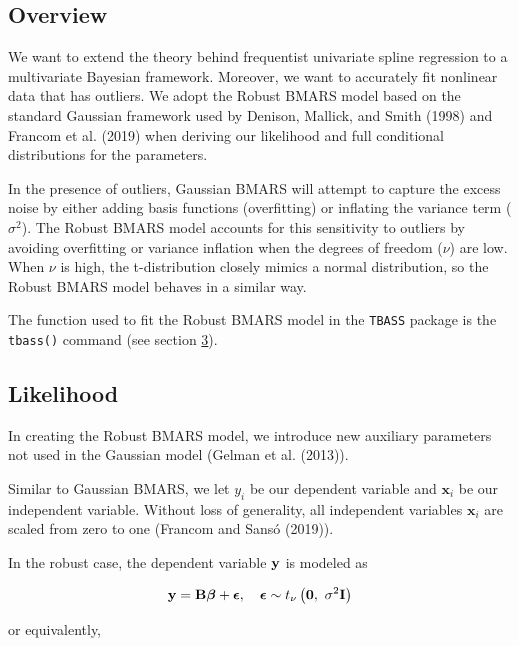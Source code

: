 \documentclass[
]{article}
\begin{document}
\hypertarget{overview}{%
\subsection{Overview}\label{overview}}

We want to extend the theory behind frequentist univariate spline
regression to a multivariate Bayesian framework. Moreover, we want to
accurately fit nonlinear data that has outliers. We adopt the Robust
BMARS model based on the standard Gaussian framework used by Denison,
Mallick, and Smith (1998) and Francom et al. (2019) when deriving our
likelihood and full conditional distributions for the parameters.

In the presence of outliers, Gaussian BMARS will attempt to capture the
excess noise by either adding basis functions (overfitting) or inflating
the variance term (\(\sigma^2\)). The Robust BMARS model accounts for
this sensitivity to outliers by avoiding overfitting or variance
inflation when the degrees of freedom (\(\nu\)) are low. When \(\nu\) is
high, the t-distribution closely mimics a normal distribution, so the
Robust BMARS model behaves in a similar way.

The function used to fit the Robust BMARS model in the \texttt{TBASS}
package is the \texttt{tbass()} command (see section
\protect\hyperlink{tbass}{3}).

\hypertarget{likelihood}{%
\subsection{Likelihood}\label{likelihood}}

In creating the Robust BMARS model, we introduce new auxiliary
parameters not used in the Gaussian model (Gelman et al. (2013)).

Similar to Gaussian BMARS, we let \(y_i\) be our dependent variable and
\(\mathbf{x}_i\) be our independent variable. Without loss of
generality, all independent variables \(\mathbf{x}_i\) are scaled from
zero to one (Francom and Sansó (2019)).

In the robust case, the dependent variable \(\bf y\) is modeled as

\begin{equation}
\label{2}
{\bf y} = {\bf B}\boldsymbol{\beta} + {\boldsymbol\epsilon}, \quad {\boldsymbol\epsilon} \sim t_{\nu}\left({\bf 0}, ~ \sigma^2 {\bf I}\right)
\end{equation}

or equivalently,
\end{document}
